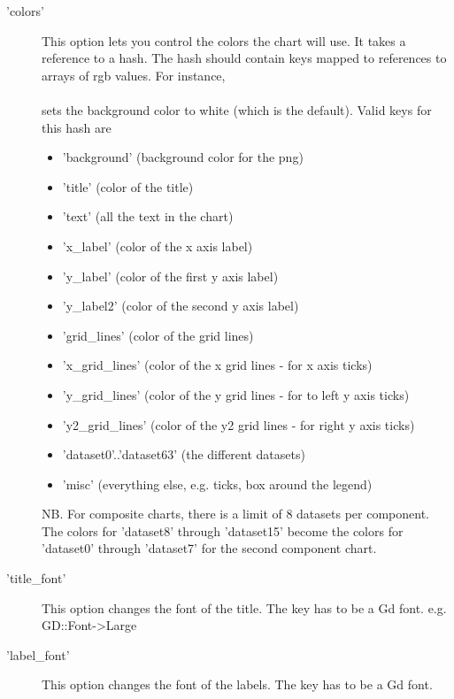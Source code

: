 \begin{description}
\item['colors']This option lets you control the colors the chart will use.  
              It takes a reference to a hash.  
              The hash should contain keys mapped to references to arrays of rgb values.  
              For instance,\\
              \\
              sets the background color to white (which is the default).  
              Valid keys for this hash are
              \begin{itemize}
              \item 'background' (background color for the png)
              \item 'title' (color of the title)
              \item 'text' (all the text in the chart)
              \item 'x\_label' (color of the x axis label)
              \item 'y\_label' (color of the first y axis label)
              \item 'y\_label2' (color of the second y axis label)
              \item 'grid\_lines' (color of the grid lines)
              \item 'x\_grid\_lines' (color of the x grid lines - for x axis ticks)
              \item 'y\_grid\_lines' (color of the y grid lines - for to left y axis ticks)
              \item 'y2\_grid\_lines' (color of the y2 grid lines - for right y axis ticks)
              \item 'dataset0'..'dataset63' (the different datasets)
              \item 'misc' (everything else, e.g. ticks, box around the legend)
              \end{itemize}
             NB. For composite charts, there is a limit of 8 datasets per component. 
             The colors for 'dataset8' through 'dataset15' 
             become the colors for 'dataset0' through 'dataset7' for the second component chart.

\item['title\_font'] This option changes the font of the title. 
               The key has to be a Gd font. e.g. GD::Font->Large 

\item['label\_font'] This option changes the font of the labels. The key has to be a Gd font. 


\end{description}
